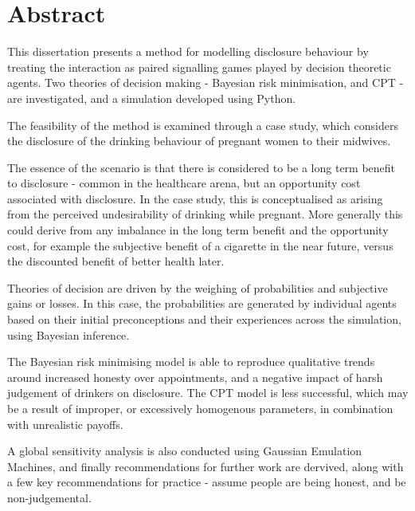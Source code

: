 \begingroup
\let\clearpage\relax
\let\cleardoublepage\relax



\section*{Abstract}

This dissertation presents a method for modelling disclosure behaviour
by treating the interaction as paired signalling games played by decision
theoretic agents. Two theories of decision making - Bayesian risk
minimisation, and \ac{CPT} - are investigated, and a simulation developed
using Python.

The feasibility of the method is examined through a case study, which
considers the disclosure of the drinking behaviour of pregnant women
to their midwives. 

The essence of the scenario is that there is considered to be a long
term benefit to disclosure - common in the healthcare arena, but an
opportunity cost associated with disclosure. In the case study, this
is conceptualised as arising from the perceived undesirability of
drinking while pregnant. More generally this could derive from any
imbalance in the long term benefit and the opportunity cost, for example
the subjective benefit of a cigarette in the near future, versus the
discounted benefit of better health later.

Theories of decision are driven by the weighing of probabilities and
subjective gains or losses. In this case, the probabilities are generated
by individual agents based on their initial preconceptions and their
experiences across the simulation, using Bayesian inference.

The Bayesian risk minimising model is able to reproduce qualitative
trends around increased honesty over appointments, and a negative
impact of harsh judgement of drinkers on disclosure. The \ac{CPT}
model is less successful, which may be a result of improper, or excessively
homogenous parameters, in combination with unrealistic payoffs.

A global sensitivity analysis is also conducted using Gaussian Emulation
Machines, and finally recommendations for further work are dervived, along
with a few key recommendations for practice - assume people are being honest,
and be non-judgemental.

\vfill{}


\endgroup

